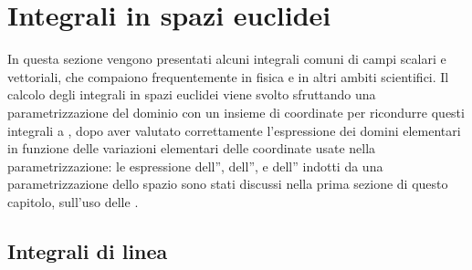 \documentclass[letterpaper,10pt,italian]{jupyterBook}
\begin{document}
\section{Integrali in spazi euclidei}
\label{\detokenize{ch/vector-calculus/integrals:integrali-in-spazi-euclidei}}\label{\detokenize{ch/vector-calculus/integrals:vector-calculus-integrals}}\label{\detokenize{ch/vector-calculus/integrals::doc}}
\sphinxAtStartPar
In questa sezione vengono presentati alcuni integrali comuni di campi scalari e vettoriali, che compaiono frequentemente in fisica e in altri ambiti scientifici. Il calcolo degli integrali in spazi euclidei viene svolto sfruttando una parametrizzazione del dominio con un insieme di coordinate per ricondurre questi integrali a {\hyperref[\detokenize{ch/multivariable-calculus/integrals:multivariable-calculus-integrals}]{}}, dopo aver valutato correttamente l’espressione dei domini elementari in funzione delle variazioni elementari delle coordinate usate nella parametrizzazione: le espressione dell”{\hyperref[\detokenize{ch/vector-calculus/geometry:vector-calculus-geometry-lines-infinitesimal}]{}}, dell”{\hyperref[\detokenize{ch/vector-calculus/geometry:vector-calculus-geometry-surfaces-infinitesimal}]{}}, e dell”{\hyperref[\detokenize{ch/vector-calculus/geometry:vector-calculus-geometry-volumes-infinitesimal}]{}} indotti da una parametrizzazione dello spazio sono stati discussi nella prima sezione di questo capitolo, sull’uso delle {\hyperref[\detokenize{ch/vector-calculus/geometry:vector-calculus-geometry}]{}}.


\subsection{Integrali di linea}
\label{\detokenize{ch/vector-calculus/integrals:integrali-di-linea}}\label{\detokenize{ch/vector-calculus/integrals:vector-calculus-integrals-line}}
\end{document}
